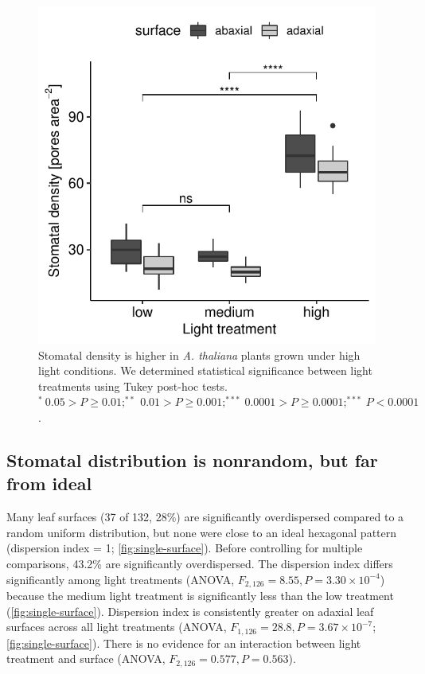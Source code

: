 \documentclass[12pt,halfline,a4paper,]{ouparticle}
\begin{document}
\begin{figure}[ht]
\includegraphics[width = \textwidth]{figures/density.pdf}
\caption{Stomatal density is higher in \textit{A. thaliana} plants grown under high light conditions. We determined statistical significance between light treatments using Tukey post-hoc tests. $^*~0.05 > P \ge 0.01; ^{**}~0.01 > P \ge 0.001; ^{***}~0.0001 > P \ge 0.0001; ^{***}~ P <0.0001$.}
\label{fig:density}
\end{figure}

\hypertarget{stomatal-distribution-is-nonrandom-but-far-from-ideal}{%
\subsection{Stomatal distribution is nonrandom, but far from
ideal}\label{stomatal-distribution-is-nonrandom-but-far-from-ideal}}

Many leaf surfaces (37 of 132, 28\%) are significantly overdispersed
compared to a random uniform distribution, but none were close to an
ideal hexagonal pattern (dispersion index = 1;
\autoref{fig:single-surface}). Before controlling for multiple
comparisons, 43.2\% are significantly overdispersed. The dispersion
index differs significantly among light treatments (ANOVA,
\(F_{2,126} = 8.55, P = 3.30 \times 10^{-4}\)) because the medium light
treatment is significantly less than the low treatment
(\autoref{fig:single-surface}). Dispersion index is consistently greater
on adaxial leaf surfaces across all light treatments (ANOVA,
\(F_{1,126} = 28.8, P = 3.67 \times 10^{-7}\);
\autoref{fig:single-surface}). There is no evidence for an interaction
between light treatment and surface (ANOVA,
\(F_{2,126} = 0.577, P = 0.563\)).
\end{document}
